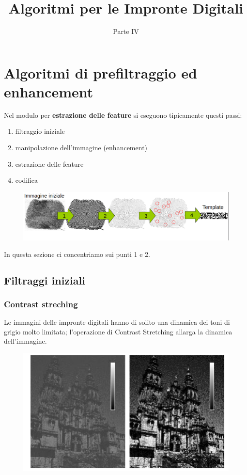 \documentclass{report}
\title{Algoritmi per le Impronte Digitali}
\date{Parte IV}
\begin{document}
\maketitle

\tableofcontents
\newpage

\chapter{Algoritmi di prefiltraggio ed enhancement}


Nel modulo per \textbf{estrazione delle feature} si eseguono
tipicamente questi passi:
\begin{enumerate}
    \item filtraggio iniziale
    \item manipolazione dell'immagine (enhancement)
    \item estrazione delle feature
    \item codifica
\end{enumerate}

\begin{figure}[ht]
    \centering
    \includegraphics[width=1\linewidth]{images/estrazione-fet.png}
\end{figure}

In questa sezione ci concentriamo sui punti 1 e 2.

\newpage
\section{Filtraggi iniziali}

\subsection{Contrast streching}
Le immagini delle impronte digitali hanno di
solito una dinamica dei toni di grigio molto
limitata; l’operazione di Contrast Stretching allarga la
dinamica dell’immagine.

\begin{figure}[ht]
    \centering
    \includegraphics[width=0.5\linewidth]{images/constrast-stre.png}
\end{figure}
\end{document}

